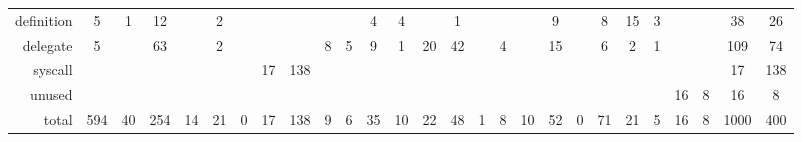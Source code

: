 \begin{table*}[!t]
\begin{adjustbox}{max width=\textwidth}
\begin{tabular}{r|cc|cc|cc|cc|cc|cc|cc|cc|cc|cc|cc|cc|cc}
\rowcolor{verylightgray}
         definition &    5 &    1 &   12 &      &    2 &      &       &      &        &      &    4 &    4 &      &    1 &      &      &        &    9 &       &    8 &      15 &    3 &      &      &    38 &   26 \\
           delegate &    5 &      &   63 &      &    2 &      &       &      &      8 &    5 &    9 &    1 &   20 &   42 &      &    4 &        &   15 &       &    6 &       2 &    1 &      &      &   109 &   74 \\
\rowcolor{verylightgray}
            syscall &      &      &      &      &      &      &    17 &  138 &        &      &      &      &      &      &      &      &        &      &       &      &         &      &      &      &    17 &  138 \\
             unused &      &      &      &      &      &      &       &      &        &      &      &      &      &      &      &      &        &      &       &      &         &      &   16 &    8 &    16 &    8 \\ \hline
\rowcolor{verylightgray}
                  total &  594 &   40 &  254 &   14 &   21 &    0 &    17 &  138 &      9 &    6 &   35 &   10 &   22 &   48 &    1 &    8 &     10 &   52 &     0 &   71 &      21 &    5 &   16 &    8 &  1000 &  400 \\
\end{tabular}

    \end{adjustbox}
        \vspace{-10pt}
\end{table*}